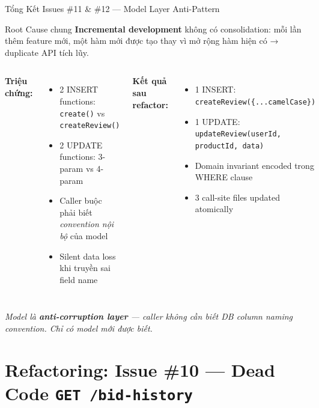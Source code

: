 \documentclass[12pt]{beamer}
\begin{document}
\begin{frame}{Tổng Kết Issues \#11 \& \#12 — Model Layer Anti-Pattern}
  \begin{block}{Root Cause chung}
    \textbf{Incremental development} không có consolidation: mỗi lần thêm feature mới, một hàm mới được tạo thay vì mở rộng hàm hiện có → duplicate API tích lũy.
  \end{block}

  \bigskip
  \begin{columns}[t]
    \textbf{Triệu chứng:}
    \begin{itemize}
      \item 2 INSERT functions: \texttt{create()} vs \texttt{createReview()}
      \item 2 UPDATE functions: 3-param vs 4-param
      \item Caller buộc phải biết \emph{convention nội bộ} của model
      \item Silent data loss khi truyền sai field name
    \end{itemize}

    \textbf{Kết quả sau refactor:}
    \begin{itemize}
      \item 1 INSERT: \texttt{createReview(\{...camelCase\})}
      \item 1 UPDATE: \texttt{updateReview(userId, productId, data)}
      \item Domain invariant encoded trong WHERE clause
      \item 3 call-site files updated atomically
    \end{itemize}
  \end{columns}

  \bigskip
  \begin{center}
    \textit{Model là \textbf{anti-corruption layer} — caller không cần biết DB column naming convention. Chỉ có model mới được biết.}
  \end{center}
\end{frame}

\section{Refactoring: Issue \#10 — Dead Code \texttt{GET /bid-history}}
\end{document}
